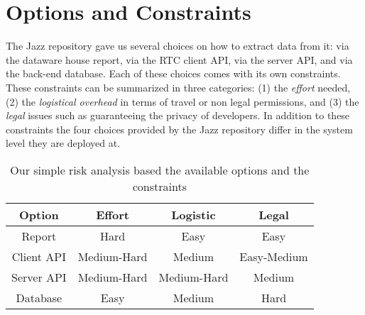 \section{Options and Constraints}
The Jazz repository gave us several choices on how to extract data from it: via the dataware house report, via the RTC client API, via the server API, and via the back-end database. Each of these choices comes with its own constraints. These constraints can be summarized in three categories: (1) the \emph{effort} needed, (2) the \emph{logistical overhead} in terms of travel or non legal permissions, and (3) the \emph{legal} issues such as guaranteeing the privacy of developers. In  addition to these constraints the four choices provided by the Jazz repository differ in the system level they are deployed at.
 
\begin{table}[h]
\begin{center}
{\small
\begin{tabular}{|c|c|c|c|}
\hline \textbf{Option} & \textbf{Effort} & \textbf{Logistic} & \textbf{Legal} 	\\
\hline                
Report		& Hard 		& Easy	 	& Easy	\\ 
\hline
Client API	& Medium-Hard	& Medium	& Easy-Medium	\\ 
\hline
Server API	& Medium-Hard	& Medium-Hard	& Medium	\\ 
\hline
Database	& Easy		& Medium	& Hard	\\ 
\hline
\end{tabular}
}

\end{center}
\caption{Our simple risk analysis based the available options and the constraints}
\label{tab:OptionsVsConstraints}
\end{table}%


